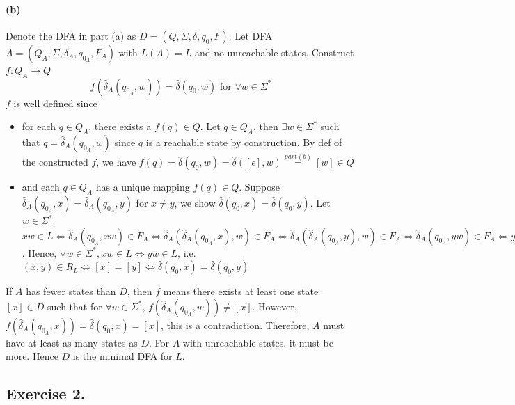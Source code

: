 \documentclass[12pt]{article}
\begin{document}
\paragraph*{(b)} Denote the DFA in part (a) as \(D = (Q, \Sigma, \delta, q_{0}, F)\). Let DFA \(A = (Q_{A}, \Sigma, \delta_{A}, q_{0_{A}}, F_{A})\) with \(L(A) = L\) and no unreachable states. Construct \(f : Q_A \to Q\)
\begin{equation*}
  f(\hat{\delta}_A(q_{0_{A}}, w)) = \hat{\delta}(q_0, w) \text{ for } \forall w \in \Sigma^*
\end{equation*}
\(f\) is well defined since
\begin{itemize}
  \item for each \(q \in Q_{A}\), there exists a \(f(q) \in Q\). Let \(q \in Q_A\), then \(\exists w \in \Sigma^*\) such that \(q = \hat{\delta}_A(q_{0_{A}}, w)\) since \(q\) is a reachable state by construction. By def of the constructed \(f\), we have \(f(q) = \hat{\delta}(q_0, w) = \hat{\delta}([\epsilon], w) \overset{part (b)}{=} [w] \in Q\)
  \item and each \(q \in Q_{A}\) has a unique mapping \(f(q) \in Q\). Suppose \(\hat{\delta}_A(q_{0_{A}}, x) = \hat{\delta}_A(q_{0_{A}}, y)\) for \(x \neq y\), we show \(\hat{\delta}(q_0, x) = \hat{\delta}(q_0, y)\). Let \(w \in \Sigma^*\). \(xw \in L \Leftrightarrow \hat{\delta}_A(q_{0_{A}}, xw) \in F_A \Leftrightarrow \hat{\delta}_A(\hat{\delta}_A(q_{0_{A}}, x), w) \in F_A \Leftrightarrow \hat{\delta}_A(\hat{\delta}_A(q_{0_{A}}, y), w) \in F_A \Leftrightarrow \hat{\delta}_A(q_{0_{A}}, yw) \in F_A \Leftrightarrow yw \in L\). Hence, \(\forall w \in \Sigma^*, xw \in L \Leftrightarrow yw \in L\), i.e. \((x,y) \in R_L \Leftrightarrow [x] = [y] \Leftrightarrow \hat{\delta}(q_0, x) = \hat{\delta}(q_0, y)\)
\end{itemize}
If \(A\) has fewer states than \(D\), then \(f\) means there exists at least one state \([x] \in D\) such that for \(\forall w \in \Sigma^*\), \(f(\hat{\delta}_A(q_{0_{A}}, w)) \neq [x]\). However, \(f(\hat{\delta}_A(q_{0_{A}}, x)) = \hat{\delta}(q_0, x) = [x]\), this is a contradiction. Therefore, \(A\) must have at least as many states as \(D\). For \(A\) with unreachable states, it must be more. Hence \(D\) is the minimal DFA for \(L\).

\subsection*{Exercise 2.} 
\end{document}
